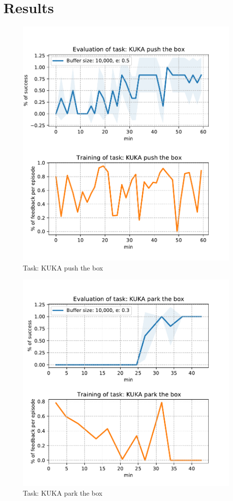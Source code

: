 \chapter{Results}
\label{chapter:Results}



\begin{figure}[H]
    \centering
    \includegraphics[width=.7\textwidth]{figures/kukapush.pdf}
    \caption{Task: KUKA push the box}
    \label{fig:kukapush}
\end{figure}

\begin{figure}[H]
    \centering
    \includegraphics[width=.7\textwidth]{figures/kukapark.pdf}
    \caption{Task: KUKA park the box}
    \label{fig:kukapark}
\end{figure}